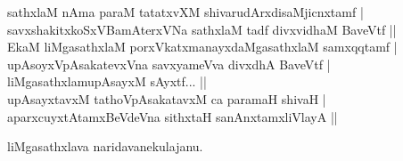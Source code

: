 \begin{entry}
\begin{shl}
sathxlaM nAma paraM tatatxvXM shivarudArxdisaMjicnxtamf |\\
savxshakitxkoSxVBamAterxVNa sathxlaM tadf divxvidhaM BaveVtf ||\\
EkaM liMgasathxlaM porxVkatxmanayxdaMgasathxlaM samxqqtamf |\\
upAsoyxVpAsakatevxVna savxyameVva divxdhA BaveVtf |\\
liMgasathxlamupAsayxM sAyxtf... ||\\
upAsayxtavxM tathoVpAsakatavxM ca paramaH shivaH |\\
aparxcuyxtAtamxBeVdeVna sithxtaH sanAnxtamxliVlayA || 
\end{shl}


\gl{}
\begin{shl}
liMgasathxlava naridavanekulajanu.
\end{shl}
\end{entry}

